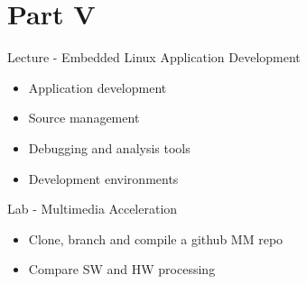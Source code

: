 \documentclass[a4paper,12pt,obeyspaces,spaces,hyphens]{article}
\begin{document}
\section{Part V}

\feagendatwocolumn
{Lecture - Embedded Linux Application Development}
{
  \begin{itemize}
    \item Application development
    \item Source management
    \item Debugging and analysis tools
    \item Development environments
  \end{itemize}
}
{Lab - Multimedia Acceleration}
{
  \begin{itemize}
    \item Clone, branch and compile a github MM repo
    \item Compare SW and HW processing
 \end{itemize}
}
\end{document}
